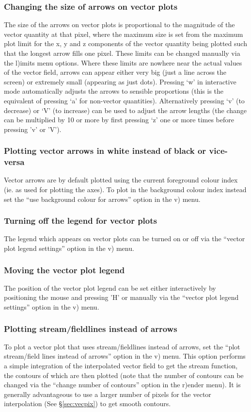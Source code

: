 \documentclass[a4paper,11pt]{article}
\begin{document}
\subsubsection{ Changing the size of arrows on vector plots}
 The size of the arrows on vector plots is proportional to the magnitude of the vector quantity at that pixel, where the maximum size is set from the maximum plot limit for the x, y and z components of the vector quantity being plotted such that the longest arrow fills one pixel. These limits can be changed manually via the l)imits menu options. Where these limits are nowhere near the actual values of the vector field, arrows can appear either very big (just a line across the screen) or extremely small (appearing as just dots). Pressing `w' in interactive mode automatically adjusts the arrows to sensible proportions (this is the equivalent of pressing `a' for non-vector quantities). Alternatively pressing `v' (to decrease) or `V' (to increase) can be used to adjust the arrow lengths (the change can be multiplied by 10 or more by first pressing `z' one or more times before pressing 'v' or 'V').

\subsubsection{ Plotting vector arrows in white instead of black or vice-versa}
 Vector arrows are by default plotted using the current foreground colour index (ie. as used for plotting the axes). To plot in the background colour index instead set the ``use background colour for arrows'' option in the v) menu.

\subsubsection{ Turning off the legend for vector plots}
 The legend which appears on vector plots can be turned on or off via the ``vector plot legend settings'' option in the v) menu.

\subsubsection{ Moving the vector plot legend}
 The position of the vector plot legend can be set either interactively by positioning the mouse and pressing 'H' or manually via the ``vector plot legend settings'' option in the v) menu.

\subsubsection{ Plotting stream/fieldlines instead of arrows}
 To plot a vector plot that uses stream/fieldlines instead of arrows, set the ``plot stream/field lines instead of arrows'' option in the v) menu. This option performs a simple integration of the interpolated vector field to get the stream function, the contours of which are then plotted (note that the number of contours can be changed via the ``change number of contours'' option in the r)ender menu). It is generally advantageous to use a larger number of pixels for the vector interpolation (See \S\ref{sec:vecpix}) to get smooth contours.
 
\end{document}
